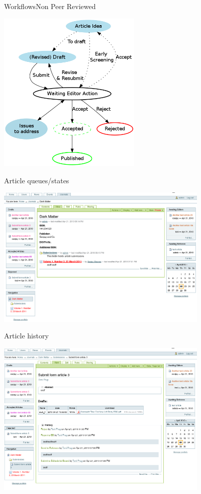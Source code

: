 \begin{frame}{Workflows}{Non Peer Reviewed}
\begin{center}
\includegraphics[width=2.7in]{WorkflowNonPR.png}
\end{center}
\end{frame}

\begin{frame}{Article queues/states}{}
\begin{center}
\includegraphics[width=4in]{5-darkmatter-ArticleQueues.png}
\end{center}
\end{frame} 

\begin{frame}{Article history}{}
\begin{center}
\includegraphics[width=4in]{6-darkmatter-ArticleHistory.png}
\end{center}
\end{frame} 


